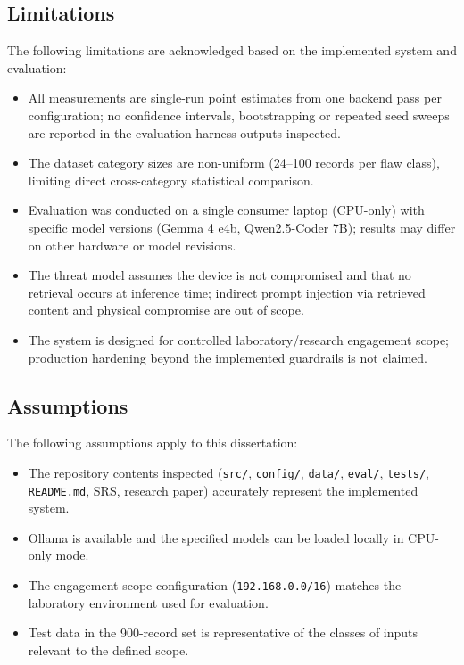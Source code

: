 \subsection{Limitations}

The following limitations are acknowledged based on the implemented system and evaluation:
\begin{itemize}
  \item All measurements are single-run point estimates from one backend pass per configuration; no confidence intervals, bootstrapping or repeated seed sweeps are reported in the evaluation harness outputs inspected.
  \item The dataset category sizes are non-uniform (24--100 records per flaw class), limiting direct cross-category statistical comparison.
  \item Evaluation was conducted on a single consumer laptop (CPU-only) with specific model versions (Gemma 4 e4b, Qwen2.5-Coder 7B); results may differ on other hardware or model revisions.
  \item The threat model assumes the device is not compromised and that no retrieval occurs at inference time; indirect prompt injection via retrieved content and physical compromise are out of scope.
  \item The system is designed for controlled laboratory/research engagement scope; production hardening beyond the implemented guardrails is not claimed.
\end{itemize}

\subsection{Assumptions}

The following assumptions apply to this dissertation:
\begin{itemize}
  \item The repository contents inspected (\texttt{src/}, \texttt{config/}, \texttt{data/}, \texttt{eval/}, \texttt{tests/}, \texttt{README.md}, SRS, research paper) accurately represent the implemented system.
  \item Ollama is available and the specified models can be loaded locally in CPU-only mode.
  \item The engagement scope configuration (\texttt{192.168.0.0/16}) matches the laboratory environment used for evaluation.
  \item Test data in the 900-record set is representative of the classes of inputs relevant to the defined scope.
\end{itemize}

